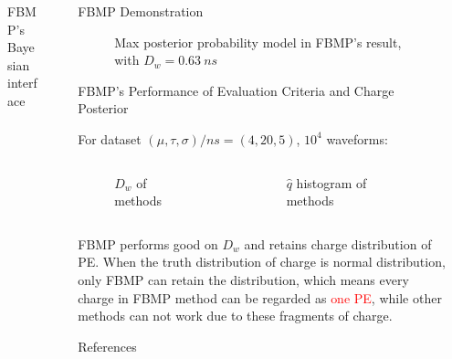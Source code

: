 \documentclass[final]{beamer}
\newlength{\sepwidth}
\newlength{\colwidth}
\newcommand{\separatorcolumn}{\begin{column}{\sepwidth}\end{column}}
\begin{document}
\begin{frame}[t]
\begin{columns}[t]
\begin{column}{\colwidth}
\begin{alertblock}{FBMP's Bayesian interface}
  \end{alertblock}

\end{column}

\separatorcolumn

\begin{column}{\colwidth}

  \begin{block}{FBMP Demonstration}

    \begin{figure}
      \centering
      \resizebox{0.8\textwidth}{!}{}
      \caption{Max posterior probability model in FBMP's result, with $D_w=\SI{0.63}{ns}$}
    \end{figure}

  \end{block}

  \begin{block}{FBMP's Performance of Evaluation Criteria and Charge Posterior}

    For dataset $(\mu, \tau, \sigma)/\si{ns}=(4, 20, 5)$, $10^4$ waveforms: 
    \begin{columns}
      \begin{figure}
        \centering
        \resizebox{\textwidth}{!}{}
        \caption{$D_w$ of methods}
      \end{figure}
      \begin{figure}
        \centering
        \resizebox{\textwidth}{!}{}
        \caption{$\hat{q}$ histogram of methods}
      \end{figure}
    \end{columns}
    FBMP performs good on $D_w$ and retains charge distribution of PE. When the truth distribution of charge is normal distribution, only FBMP can retain the distribution, which means every charge in FBMP method can be regarded as \textcolor{red}{one PE}, while other methods can not work due to these fragments of charge. 

  \end{block}

  \begin{block}{References}

    \footnotesize{}

  \end{block}

\end{column}

\separatorcolumn
\end{columns}
\end{frame}
\end{document}
